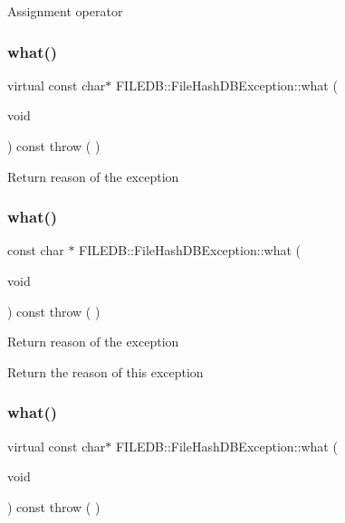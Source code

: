Assignment operator \mbox{\label{classFILEDB_1_1FileHashDBException_aa8588fe36ad351eb1c1f17db8b48d349}} 
\subsubsection{\texorpdfstring{what()}{what()}\hspace{0.1cm}{\footnotesize\ttfamily [1/3]}}
{\footnotesize\ttfamily virtual const char$\ast$ F\+I\+L\+E\+D\+B\+::\+File\+Hash\+D\+B\+Exception\+::what (\begin{DoxyParamCaption}\item[{void}]{ }\end{DoxyParamCaption}) const throw ( ) \hspace{0.3cm}{\ttfamily [virtual]}}

Return reason of the exception \mbox{\label{classFILEDB_1_1FileHashDBException_aaacefcbfdcc4a6c86affdaf5cca924e9}} 
\subsubsection{\texorpdfstring{what()}{what()}\hspace{0.1cm}{\footnotesize\ttfamily [2/3]}}
{\footnotesize\ttfamily const char $\ast$ F\+I\+L\+E\+D\+B\+::\+File\+Hash\+D\+B\+Exception\+::what (\begin{DoxyParamCaption}\item[{void}]{ }\end{DoxyParamCaption}) const throw ( ) \hspace{0.3cm}{\ttfamily [virtual]}}

Return reason of the exception

Return the reason of this exception \mbox{\label{classFILEDB_1_1FileHashDBException_aa8588fe36ad351eb1c1f17db8b48d349}} 
\subsubsection{\texorpdfstring{what()}{what()}\hspace{0.1cm}{\footnotesize\ttfamily [3/3]}}
{\footnotesize\ttfamily virtual const char$\ast$ F\+I\+L\+E\+D\+B\+::\+File\+Hash\+D\+B\+Exception\+::what (\begin{DoxyParamCaption}\item[{void}]{ }\end{DoxyParamCaption}) const throw ( ) \hspace{0.3cm}{\ttfamily [virtual]}}


